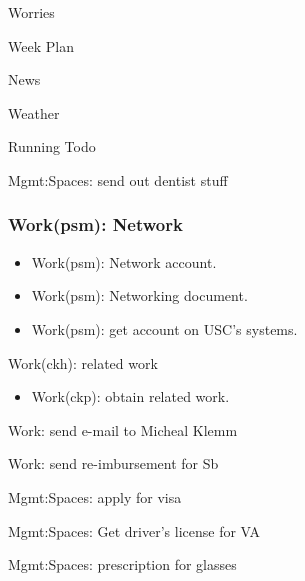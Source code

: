 \begin{frame}{Worries} 
\end{frame}

\begin{frame}{Week Plan}
\end{frame}

\begin{frame}{News}
\end{frame}

\begin{frame}[label=weather]{Weather}
\end{frame}

\begin{frame}[label=runningTodo]{Running Todo} 
\end{frame}


\begin{frame}{Mgmt:Spaces: send out dentist stuff} 
\end{frame}


\begin{frame} 
\frametitle{Work(psm): Network } 
\begin{itemize} 
\small \item \small Work(psm): Network account. 
\item \small Work(psm): Networking document. 
\item \small Work(psm): get account on USC's systems. 
\end{itemize} 
\end{frame}

\begin{frame}{ Work(ckh): related work}
\begin{itemize} 
\item \tiny Work(ckp): obtain related work. 
\end{itemize}
\end{frame} 

\begin{frame}{Work: send e-mail to Micheal Klemm} 
\end{frame}

\begin{frame}{Work: send re-imbursement for Sb} 
\end{frame}

\begin{frame}{Mgmt:Spaces: apply for visa} 
\end{frame}

\begin{frame}{Mgmt:Spaces: Get driver's license for VA} 
\end{frame}

\begin{frame}{Mgmt:Spaces: prescription for glasses}
\end{frame}
